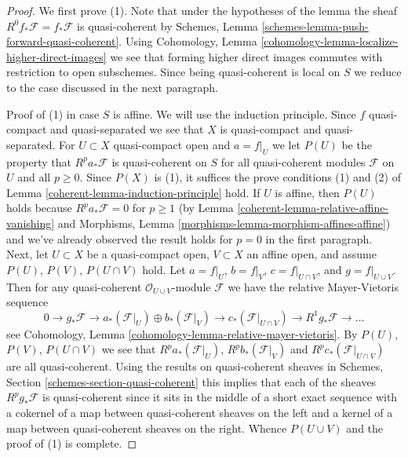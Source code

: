 \begin{proof}

We first prove (1). Note that under the hypotheses of the lemma the sheaf
$R^0f_*\mathcal{F} = f_*\mathcal{F}$ is quasi-coherent by
Schemes, Lemma \ref{schemes-lemma-push-forward-quasi-coherent}.
Using
Cohomology, Lemma \ref{cohomology-lemma-localize-higher-direct-images}
we see that forming higher direct images commutes with restriction
to open subschemes. Since being quasi-coherent is local on $S$ we
reduce to the case discussed in the next paragraph.

\medskip\noindent
Proof of (1) in case $S$ is affine. We will use the induction principle.
Since $f$ quasi-compact and quasi-separated we see that $X$
is quasi-compact and quasi-separated. For $U \subset X$
quasi-compact open and $a = f|_U$ we let $P(U)$ be the property that
$R^pa_*\mathcal{F}$ is quasi-coherent on $S$ for all quasi-coherent modules
$\mathcal{F}$ on $U$ and all $p \geq 0$. Since $P(X)$ is (1), it suffices
the prove conditions (1) and (2) of Lemma \ref{coherent-lemma-induction-principle} hold.
If $U$ is affine, then $P(U)$ holds because $R^pa_*\mathcal{F} = 0$ for
$p \geq 1$ (by  Lemma \ref{coherent-lemma-relative-affine-vanishing} and
Morphisms, Lemma \ref{morphisms-lemma-morphism-affines-affine})
and we've already observed the result holds for $p = 0$ in the first
paragraph. Next, let $U \subset X$ be a quasi-compact open, $V \subset X$
an affine open, and assume $P(U)$, $P(V)$, $P(U \cap V)$ hold.
Let $a = f|_U$, $b = f|_V$, $c = f|_{U \cap V}$, and $g = f|_{U \cup V}$.
Then for any quasi-coherent $\mathcal{O}_{U \cup V}$-module $\mathcal{F}$
we have the relative Mayer-Vietoris sequence
$$
0 \to
g_*\mathcal{F} \to
a_*(\mathcal{F}|_U) \oplus b_*(\mathcal{F}|_V) \to
c_*(\mathcal{F}|_{U \cap V}) \to
R^1g_*\mathcal{F} \to \ldots
$$
see Cohomology, Lemma \ref{cohomology-lemma-relative-mayer-vietoris}.
By $P(U)$, $P(V)$, $P(U \cap V)$ we see that
$R^pa_*(\mathcal{F}|_U)$, $R^pb_*(\mathcal{F}|_V)$ and
$R^pc_*(\mathcal{F}|_{U \cap V})$ are all quasi-coherent.
Using the results on quasi-coherent sheaves in
Schemes, Section \ref{schemes-section-quasi-coherent}
this implies that each of the sheaves
$R^pg_*\mathcal{F}$ is quasi-coherent since it sits in the middle of a short
exact sequence with a cokernel of a map between quasi-coherent sheaves
on the left and a kernel of a map between quasi-coherent sheaves on the right.
Whence $P(U \cup V)$ and the proof of (1) is complete.


\end{proof}
